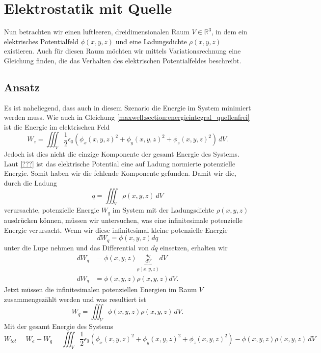 \section{Elektrostatik mit Quelle
\label{maxwell:section:elektrostatik_mit_quelle}}
Nun betrachten wir einen luftleeren, dreidimensionalen Raum $V\in\mathbb{R}^3$, in dem ein elektrisches Potentialfeld $\phi(x,y,z)$ und eine Ladungsdichte $\rho(x,y,z)$ existieren.
Auch für diesen Raum möchten wir mittels Variationsrechnung eine Gleichung finden, die das Verhalten des elektrischen Potentialfeldes beschreibt.

\subsection{Ansatz}
Es ist naheliegend, dass auch in diesem Szenario die Energie im System minimiert werden muss.
Wie auch in Gleichung \eqref{maxwell:section:energieintegral_quellenfrei} ist die Energie im elektrischen Feld
\[
W_e
=
\iiint_V \frac{1}{2}\epsilon_0\left(\phi_x(x,y,z)^2 + \phi_y(x,y,z)^2 + \phi_z(x,y,z)^2\right)\, dV.
\]
Jedoch ist dies nicht die einzige Komponente der gesamt Energie des Systems.
Laut \ref{???} ist das elektrische Potential eine auf Ladung normierte potenzielle Energie.
Somit haben wir die fehlende Komponente gefunden.
Damit wir die, durch die Ladung
\[
q
=
\iiint_V \rho(x,y,z)\, dV
\]
verursachte, potenzielle Energie $W_q$ im System mit der Ladungsdichte $\rho(x,y,z)$ ausdrücken können, müssen wir untersuchen, was eine infinitesimale potenzielle Energie verursacht.
Wenn wir diese infinitesimal kleine potenzielle Energie
\[
dW_q
=
\phi(x,y,z)dq
\]
unter die Lupe nehmen und das Differential von $dq$ einsetzen, erhalten wir
\begin{align*}
dW_q
&=
\phi(x,y,z)\underbrace{\frac{dq}{dV}}_{\rho(x,y,z)}dV
\\
dW_q
&=
\phi(x,y,z)\rho(x,y,z)dV.
\end{align*}
Jetzt müssen die infinitesimalen potenziellen Energien im Raum $V$ zusammengezählt werden und was resultiert ist
\begin{equation}
W_q
=
\iiint_V \phi(x,y,z)\rho(x,y,z)\, dV.
\label{maxwell:section:potenzielle_energie_ladung}
\end{equation}
Mit der gesamt Energie des Systems
\[
W_{tot}
=
W_e - W_q
=
\iiint_V \frac{1}{2}\epsilon_0\left(\phi_x(x,y,z)^2 + \phi_y(x,y,z)^2 + \phi_z(x,y,z)^2\right) - \phi(x,y,z)\rho(x,y,z)\, dV
\]
